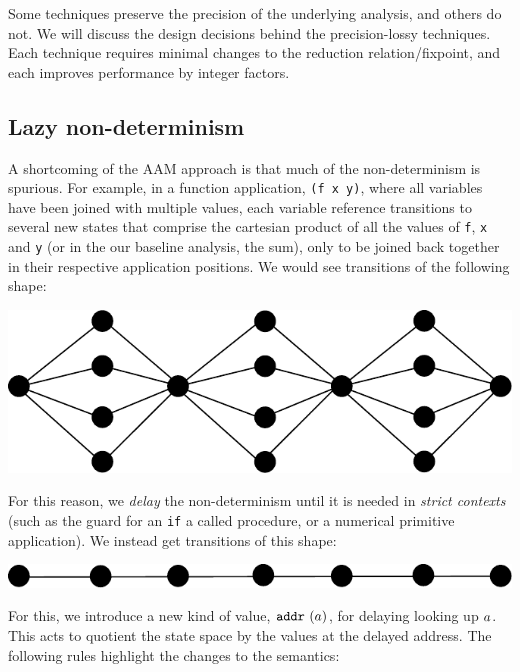 \documentclass[preprint,onecolumn,9pt]{sigplanconf} %
\begin{document}
Some techniques preserve the precision of the underlying analysis, and
others do not. We will discuss the design decisions behind the
precision-lossy techniques.  Each technique requires minimal changes
to the reduction relation/fixpoint, and each improves performance by
integer factors.

\subsection{Lazy non-determinism}

A shortcoming of the AAM approach is that much of the non-determinism
is spurious. For example, in a function application, {\tt (f x y)},
where all variables have been joined with multiple values, each
variable reference transitions to several new states that comprise the
cartesian product of all the values of {\tt f}, {\tt x} and {\tt y} (or in the our baseline analysis, the sum),
only to be joined back together in their respective application positions. We would
see transitions of the following shape:
\begin{center}
\includegraphics[scale=0.3]{fanout.pdf}
\end{center}
For this reason, we {\it delay} the non-determinism
until it is needed in {\it strict contexts} (such as the guard for an
{\tt if} a called procedure, or a numerical primitive application). We instead get transitions of this shape:
\begin{center}
\includegraphics[scale=0.3]{lazy.pdf}
\end{center}

For this, we introduce a new kind of value, ${\tt addr{\ }}({a})$, for delaying looking up $a$. This acts to quotient the state space by the values at the delayed address. The following rules highlight the changes to the semantics:
\end{document}
